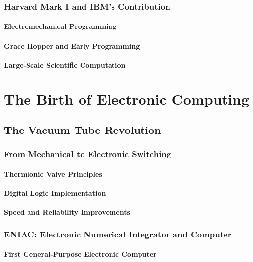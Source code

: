 \documentclass[12pt, oneside, openany]{book}
\begin{document}
\subsection{Harvard Mark I and IBM's Contribution}
\subsubsection{Electromechanical Programming}
\subsubsection{Grace Hopper and Early Programming}
\subsubsection{Large-Scale Scientific Computation}


\chapter{The Birth of Electronic Computing}

\section{The Vacuum Tube Revolution}
\subsection{From Mechanical to Electronic Switching}
\subsubsection{Thermionic Valve Principles}
\subsubsection{Digital Logic Implementation}
\subsubsection{Speed and Reliability Improvements}

\subsection{ENIAC: Electronic Numerical Integrator and Computer}
\subsubsection{First General-Purpose Electronic Computer}
\end{document}
